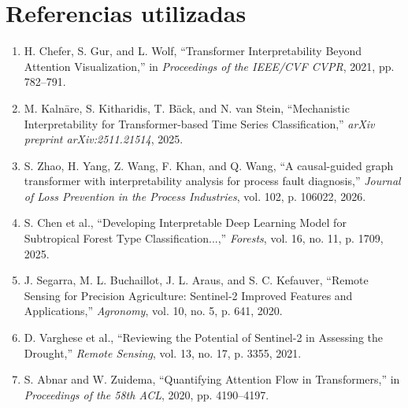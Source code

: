 \documentclass[12pt,letterpaper]{article}
\begin{document}
\section{Referencias utilizadas}

\begin{enumerate}[leftmargin=*, itemsep=0pt]
    \item H. Chefer, S. Gur, and L. Wolf, ``Transformer Interpretability Beyond Attention Visualization,'' in \textit{Proceedings of the IEEE/CVF CVPR}, 2021, pp. 782--791.
    \item M. Kalnāre, S. Kitharidis, T. Bäck, and N. van Stein, ``Mechanistic Interpretability for Transformer-based Time Series Classification,'' \textit{arXiv preprint arXiv:2511.21514}, 2025.
    \item S. Zhao, H. Yang, Z. Wang, F. Khan, and Q. Wang, ``A causal-guided graph transformer with interpretability analysis for process fault diagnosis,'' \textit{Journal of Loss Prevention in the Process Industries}, vol. 102, p. 106022, 2026.
    \item S. Chen et al., ``Developing Interpretable Deep Learning Model for Subtropical Forest Type Classification...,'' \textit{Forests}, vol. 16, no. 11, p. 1709, 2025.
    \item J. Segarra, M. L. Buchaillot, J. L. Araus, and S. C. Kefauver, ``Remote Sensing for Precision Agriculture: Sentinel-2 Improved Features and Applications,'' \textit{Agronomy}, vol. 10, no. 5, p. 641, 2020.
    \item D. Varghese et al., ``Reviewing the Potential of Sentinel-2 in Assessing the Drought,'' \textit{Remote Sensing}, vol. 13, no. 17, p. 3355, 2021.
    \item S. Abnar and W. Zuidema, ``Quantifying Attention Flow in Transformers,'' in \textit{Proceedings of the 58th ACL}, 2020, pp. 4190--4197.
\end{enumerate}
\end{document}
